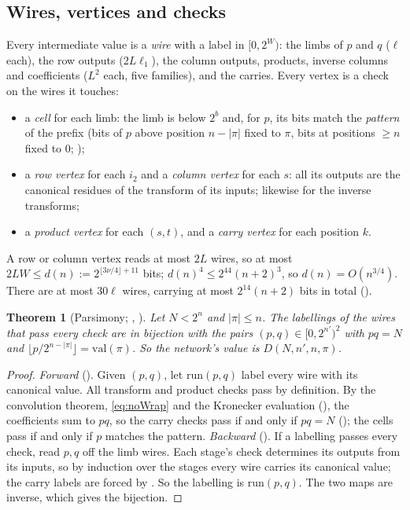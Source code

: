 \documentclass[10pt]{amsart}
\theoremstyle{plain}
\newtheorem{theorem}{Theorem}[section]
\theoremstyle{definition}
\theoremstyle{remark}
\numberwithin{equation}{section}
\begin{document}
\subsection{Wires, vertices and checks}
Every intermediate value is a \emph{wire} with a label in $[0,2^W)$: the limbs of $p$ and $q$ ($\ell$
each), the row outputs ($2L\ell_1$), the column outputs, products, inverse columns and coefficients
($L^2$ each, five families), and the carries. Every vertex is a check on the wires it touches:
\begin{itemize}
\item a \emph{cell} for each limb: the limb is below $2^b$ and, for $p$, its bits match the
\emph{pattern} of the prefix (bits of $p$ above position $n-|\pi|$ fixed to $\pi$, bits at positions
$\ge n$ fixed to $0$; );
\item a \emph{row vertex} for each $i_2$ and a \emph{column vertex} for each $s$: all its outputs are the
canonical residues of the transform of its inputs; likewise for the inverse transforms;
\item a \emph{product vertex} for each $(s,t)$, and a \emph{carry vertex} for each position $k$.
\end{itemize}
A row or column vertex reads at most $2L$ wires, so at most $2LW\le d(n):=2^{\lfloor3\nu/4\rfloor+11}$
bits; $d(n)^4\le2^{44}(n+2)^3$, so $d(n)=O(n^{3/4})$. There are at most $30\ell$ wires, carrying
at most $2^{14}(n+2)$ bits in total ().

\begin{theorem}[Parsimony; , ]\label{thm:value}
Let $N<2^n$ and $|\pi|\le n$. The labellings of the wires that pass every check are in bijection with
the pairs $(p,q)\in[0,2^{n'})^2$ with $pq=N$ and $\lfloor p/2^{n-|\pi|}\rfloor=\mathrm{val}(\pi)$. So the
network's value is $D(N,n',n,\pi)$.
\end{theorem}

\begin{proof}
\emph{Forward} (). Given $(p,q)$, let $\mathrm{run}(p,q)$ label every wire with its
canonical value. All transform and product checks pass by definition. By the convolution theorem,
\eqref{eq:noWrap} and the Kronecker evaluation (), the coefficients sum to
$pq$, so the carry checks pass if and only if $pq=N$ (); the cells pass if and
only if $p$ matches the pattern.
\emph{Backward} (). If a labelling passes every check, read $p,q$ off the limb wires.
Each stage's check determines its outputs from its inputs, so by induction over the stages every wire
carries its canonical value; the carry labels are forced by . So the labelling is
$\mathrm{run}(p,q)$. The two maps are inverse, which gives the bijection.
\end{proof}
\end{document}
